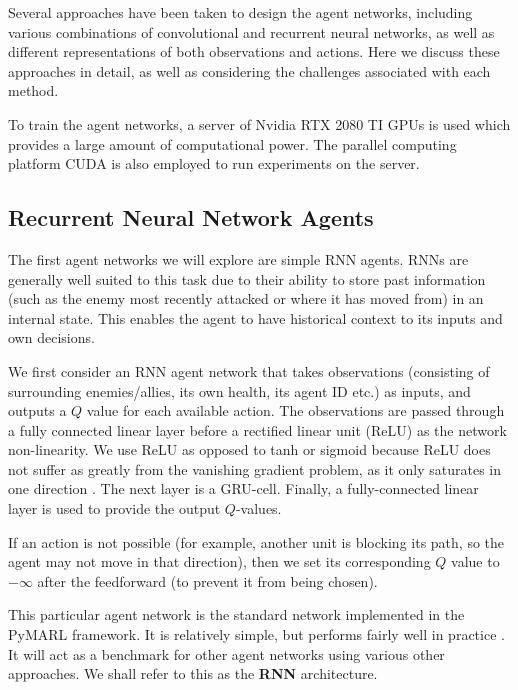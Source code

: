 Several approaches have been taken to design the agent networks, including various combinations of convolutional and recurrent neural networks, as well as different representations of both observations and actions. Here we discuss these approaches in detail, as well as considering the challenges associated with each method.



To train the agent networks, a server of Nvidia RTX 2080 TI GPUs is used which provides a large amount of computational power. The parallel computing platform CUDA \cite{cuda} is also employed to run experiments on the server.




\subsection{Recurrent Neural Network Agents}


The first agent networks we will explore are simple RNN agents. RNNs are generally well suited to this task due to their ability to store past information (such as the enemy most recently attacked or where it has moved from) in an internal state. This enables the agent to have historical context to its inputs and own decisions.

We first consider an RNN agent network that takes observations (consisting of surrounding enemies/allies, its own health, its agent ID etc.) as inputs, and outputs a $Q$ value for each available action. The observations are passed through a fully connected linear layer before a rectified linear unit (ReLU) as the network non-linearity. We use ReLU as opposed to tanh or sigmoid because ReLU does not suffer as greatly from the vanishing gradient problem, as it only saturates in one direction \cite{relu}. The next layer is a GRU-cell. Finally, a fully-connected linear layer is used to provide the output $Q$-values.

If an action is not possible (for example, another unit is blocking its path, so the agent may not move in that direction), then we set its corresponding $Q$ value to $-\infty$ after the feedforward (to prevent it from being chosen).

This particular agent network is the standard network implemented in the PyMARL framework. It is relatively simple, but performs fairly well in practice \cite{smac}. It will act as a benchmark for other agent networks using various other approaches. We shall refer to this as the \textbf{RNN} architecture.

